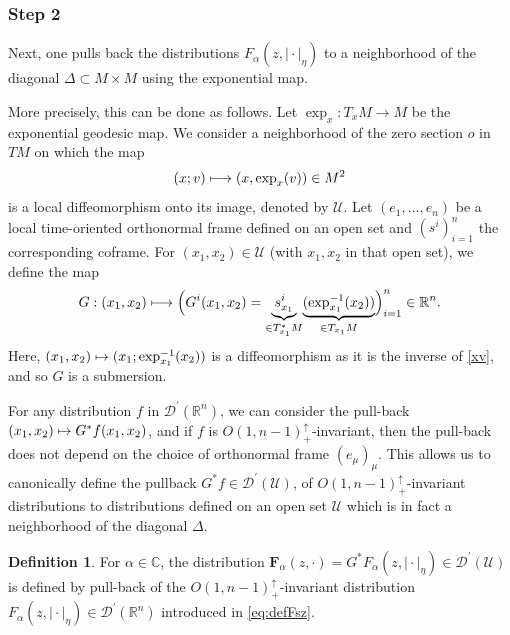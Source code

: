 \documentclass[10pt]{amsart}
\let\pazocal\mathscr
\def\mto{\mathchoice{\longmapsto}{\mapsto}{\mapsto}{\mapsto}}
\theoremstyle{definition}
\newtheorem{definition}[theorem]{Definition}
\newcommand\cc{{\mathbb C}}
\newcommand\cU{{\pazocal U}}
\let\diag\Delta
\let\cv\alpha
\let\varalpha s
\newcommand\zero{{\textit{o}}}
\newcommand{\Fse}[2][\cv]{F_{#1}(#2,\vert{\cdot} \vert_\eta)}
\newcommand{\Fe}[2][\cv]{\mathbf{F}_{#1}(#2, \cdot)}
\begin{document}
\subsubsection*{Step 2} Next, one pulls back the distributions $\Fse{z}$ to a neighborhood of the diagonal $\diag\subset M\times M$ using the exponential map.

More precisely, this can be done as follows. Let $\exp_x:T_xM\to M$ be the exponential geodesic map. We consider a neighborhood
of the zero section $\zero $ in $TM$
on which the
map
\begin{equation} \label{xv}
(x;v)\mto (x,\exp_x(v))\in M^2
\end{equation}
is a local
diffeomorphism
onto its image, denoted by $\pazocal{U}$.
Let
{$(e_1,\dots,e_n)$} be a local time-oriented orthonormal frame
defined on an open set and {$(\varalpha^i)_{i=1}^n$} the corresponding coframe. For $(x_1,x_2)\in\pazocal{U}$ (with $x_1,x_2$ in that open set), we define the map
\begin{equation*}%
G: (x_1,x_2)\mto {
\Big(G^i(x_1,x_2)=
\underset{\in T_{x_1}^* M}{\underbrace{\varalpha^i_{x_1}}}\underset{\in T_{x_1}M}{\underbrace{(\exp_{x_1}^{-1}(x_2))} } \Big)_{i=1}^n \in\mathbb{R}^{n}.}
\end{equation*}
Here, $(x_1,x_2) \mto (x_1;\exp_{x_1}^{-1}(x_2))$ is a diffeomorphism as it is the inverse of \eqref{xv}, and so $G$ is a submersion.

For any distribution $f$ in
$\pazocal{D}^\prime(\mathbb{R}^{n})$, we can consider the pull-back $(x_1,x_2)\mto G^*f(x_1,x_2)$, and if $f$ is $O(1,n-1)_+^\uparrow$-invariant,
then
the pull-back does not depend on the choice
of orthonormal frame $(e_\mu)_\mu$. This allows us to canonically define the pullback $G^*f\in \pazocal{D}^\prime(\cU)$, of
$O(1,n-1)_+^\uparrow$-invariant
distributions to distributions
defined on an open set $\pazocal{U}$ which is in fact a neighborhood
of the diagonal $\diag$.

\begin{definition}\label{d:fsneardiag}
For $\cv\in\cc$, the distribution
$\Fe{z}= G^*\Fse{z}\in \pazocal{D}^\prime(\pazocal{U})$ is defined by pull-back of the $O(1,n-1)_+^\uparrow$-invariant distribution $\Fse{z}\in \pazocal{D}^\prime\left(\mathbb{R}^{n}\right)$ introduced in \eqref{eq:defFsz}.
\end{definition}
\end{document}
